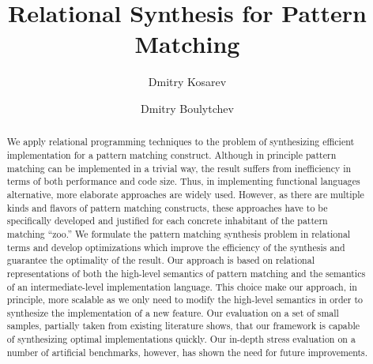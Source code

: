 \documentclass[acmlarge]{acmart}
\begin{document}
\title[Relational Synthesis of Pattern Matching]{Relational Synthesis for Pattern Matching}    



\author{Dmitry Kosarev}

\author{Dmitry Boulytchev}




\begin{abstract}
  We apply relational programming techniques to the problem of synthesizing efficient implementation for a pattern matching construct. Although in principle
  pattern matching can be implemented in a trivial way, the result suffers from inefficiency in terms of both performance and code size. Thus, in implementing functional languages alternative, more elaborate  approaches are widely used. However, as there are multiple kinds and flavors of pattern
  matching constructs, these approaches have to be specifically developed and justified for each concrete inhabitant of the pattern matching ``zoo.'' We formulate the
  pattern matching synthesis problem in relational terms and develop optimizations which improve the efficiency of the synthesis and guarantee the
  optimality of the result. Our approach is based on relational representations of both the high-level semantics of pattern matching and the semantics of
  an intermediate-level implementation language. This choice make our approach, in principle, more scalable as we only need to modify the high-level semantics in order
  to synthesize the implementation of a new feature. Our evaluation on a set of small samples, partially taken from existing literature shows, that our framework is
  capable of synthesizing optimal implementations quickly. Our in-depth stress evaluation on a number of artificial benchmarks, however,
  has shown the need for future improvements.
\end{abstract}
\end{document}
